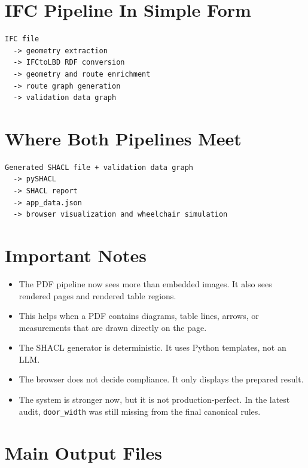 \documentclass[11pt,a4paper]{article}
\begin{document}
\section{IFC Pipeline In Simple Form}

\begin{verbatim}
IFC file
  -> geometry extraction
  -> IFCtoLBD RDF conversion
  -> geometry and route enrichment
  -> route graph generation
  -> validation data graph
\end{verbatim}

\section{Where Both Pipelines Meet}

\begin{verbatim}
Generated SHACL file + validation data graph
  -> pySHACL
  -> SHACL report
  -> app_data.json
  -> browser visualization and wheelchair simulation
\end{verbatim}

\section{Important Notes}

\begin{itemize}
  \item The PDF pipeline now sees more than embedded images. It also sees rendered pages and rendered table regions.
  \item This helps when a PDF contains diagrams, table lines, arrows, or measurements that are drawn directly on the page.
  \item The SHACL generator is deterministic. It uses Python templates, not an LLM.
  \item The browser does not decide compliance. It only displays the prepared result.
  \item The system is stronger now, but it is not production-perfect. In the latest audit, \texttt{door\_width} was still missing from the final canonical rules.
\end{itemize}

\section{Main Output Files}
\end{document}

